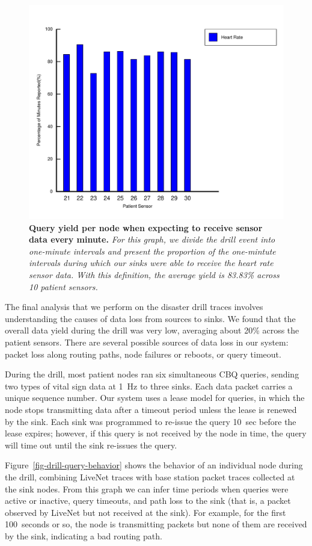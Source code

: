 \begin{figure}[t]
\begin{center}
\includegraphics[width=0.6\hsize]{./resources/livenet-sensys07/figs/drill/query-breakdown/query-coverage.pdf}
\end{center}
\caption{\small {\bf Query yield per node when expecting to receive sensor
data every minute.} {\em For this graph, we divide the drill event into
one-minute intervals and present the proportion of the one-mintute intervals
during which our sinks were able to receive the heart rate sensor data. With
this definition, the average yield is 83.83\% across 10 patient sensors.}}
\label{fig-drill-query-coverage}
\end{figure}

The final analysis that we perform on the disaster drill traces
involves understanding the causes of data loss from sources to sinks.
We found that the overall data yield during the drill was very low, 
averaging about 20\% across the patient sensors. 
There are several possible sources of data loss in our system: 
packet loss along routing paths, node failures or reboots, or query
timeout. 


During the drill, most patient nodes ran six simultaneous CBQ queries, 
sending two types of vital sign data at 1~Hz to three sinks.
Each data packet carries a unique sequence number.
Our system uses a lease model for queries, in which the node stops
transmitting data after a timeout period unless the lease is renewed
by the sink. Each sink was programmed to re-issue the query 10~sec before 
the lease expires; however, if this query is not received by the node
in time, the query will time out until the sink re-issues the query.

Figure~\ref{fig-drill-query-behavior} shows the behavior of an
individual node during the drill, combining LiveNet traces with 
base station packet traces collected at the sink nodes. 
From this graph we can infer time periods when queries were active 
or inactive, query timeouts, and path loss to the sink (that is, a packet
observed by LiveNet but not received at the sink). For example, for
the first 100~seconds or so, the node is transmitting packets but none of
them are received by the sink, indicating a bad routing path.

